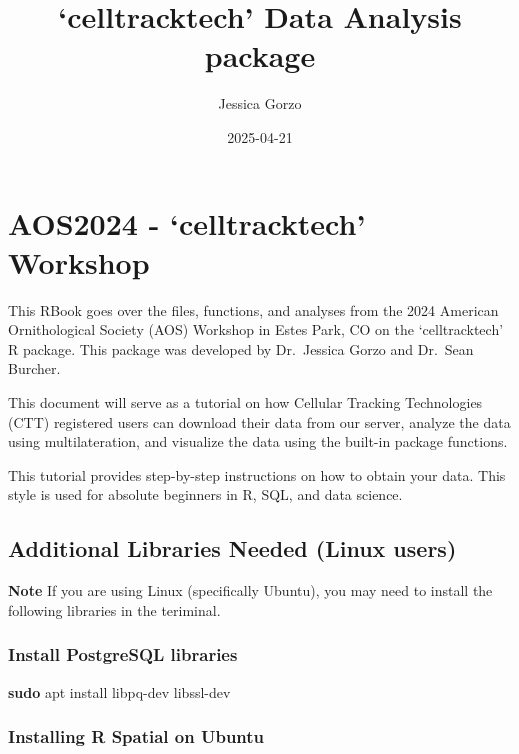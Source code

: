\documentclass[
]{book}
\title{`celltracktech' Data Analysis package}
\author{Jessica Gorzo}
\date{2025-04-21}
\newenvironment{Shaded}{\begin{snugshade}}{\end{snugshade}}
\newcommand{\FunctionTok}[1]{\textcolor[rgb]{0.13,0.29,0.53}{\textbf{#1}}}
\newcommand{\NormalTok}[1]{#1}
\begin{document}
\maketitle

{
\setcounter{tocdepth}{1}
\tableofcontents
}
\chapter{AOS2024 - `celltracktech' Workshop}\label{aos2024---celltracktech-workshop}

This RBook goes over the files, functions, and analyses from the 2024 American Ornithological Society (AOS) Workshop in Estes Park, CO on the `celltracktech' R package. This package was developed by Dr.~Jessica Gorzo and Dr.~Sean Burcher.

This document will serve as a tutorial on how Cellular Tracking Technologies (CTT) registered users can download their data from our server, analyze the data using multilateration, and visualize the data using the built-in package functions.

This tutorial provides step-by-step instructions on how to obtain your data. This style is used for absolute beginners in R, SQL, and data science.

\section{Additional Libraries Needed (Linux users)}\label{additional-libraries-needed-linux-users}

\textbf{Note} If you are using Linux (specifically Ubuntu), you may need to install the following libraries in the teriminal.

\subsection{Install PostgreSQL libraries}\label{install-postgresql-libraries}

\begin{Shaded}
\begin{Highlighting}[]
\FunctionTok{sudo}\NormalTok{ apt install libpq{-}dev libssl{-}dev}
\end{Highlighting}
\end{Shaded}

\subsection{Installing R Spatial on Ubuntu}\label{installing-r-spatial-on-ubuntu}
\end{document}
